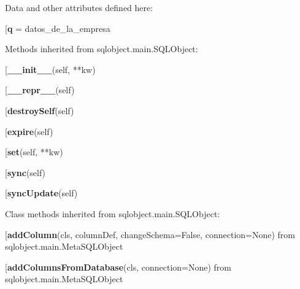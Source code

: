 Data and other attributes defined here:\\
\begin{description}\item[{\bf q} = datos\_de\_la\_empresa\end{description}


Methods inherited from sqlobject.main.SQLObject:\\
\begin{description}\item[{\bf \_\_init\_\_}(self, **kw)\end{description}

\begin{description}\item[{\bf \_\_repr\_\_}(self)\end{description}

\begin{description}\item[{\bf destroySelf}(self)\end{description}

\begin{description}\item[{\bf expire}(self)\end{description}

\begin{description}\item[{\bf set}(self, **kw)\end{description}

\begin{description}\item[{\bf sync}(self)\end{description}

\begin{description}\item[{\bf syncUpdate}(self)\end{description}


Class methods inherited from sqlobject.main.SQLObject:\\
\begin{description}\item[{\bf addColumn}(cls, columnDef, changeSchema=False, connection=None) from sqlobject.main.MetaSQLObject\end{description}

\begin{description}\item[{\bf addColumnsFromDatabase}(cls, connection=None) from sqlobject.main.MetaSQLObject\end{description}


